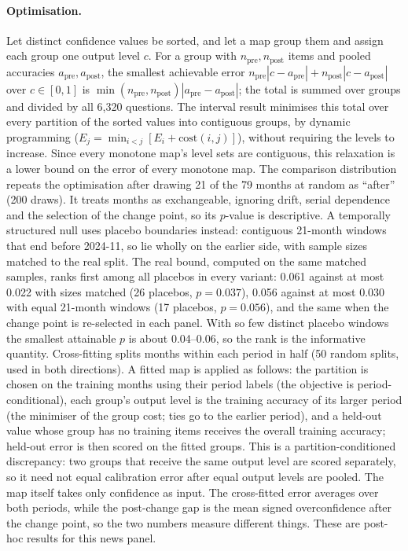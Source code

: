 \documentclass[10pt,twocolumn]{article}
\begin{document}
\paragraph{Optimisation.} Let distinct confidence values be sorted, and let a
map group them and assign each group one output level $c$. For a group with
$n_{\text{pre}}, n_{\text{post}}$ items and pooled accuracies $a_{\text{pre}},
a_{\text{post}}$, the smallest achievable error $n_{\text{pre}}|c-a_{\text{pre}}|
+ n_{\text{post}}|c-a_{\text{post}}|$ over $c\in[0,1]$ is $\min(n_{\text{pre}},
n_{\text{post}})|a_{\text{pre}}-a_{\text{post}}|$; the total is summed over groups and
divided by all 6{,}320 questions. The interval result minimises this total over
every partition of the sorted values into contiguous groups, by dynamic
programming ($E_j=\min_{i<j}[E_i+\text{cost}(i,j)]$), without requiring the
levels to increase. Since every monotone map's level sets are contiguous, this
relaxation is a lower bound on the error of every monotone map. The
comparison distribution repeats the optimisation after drawing 21 of the 79
months at random as ``after'' (200 draws). It treats months as exchangeable,
ignoring drift, serial dependence and the selection of the change point, so
its $p$-value is descriptive. A temporally structured null uses placebo
boundaries instead: contiguous 21-month windows that end before 2024-11, so
lie wholly on the earlier side, with sample sizes matched to the real split.
The real bound, computed on the same matched samples, ranks first among all
placebos in every variant: 0.061 against
at most 0.022 with sizes matched (26 placebos, $p=0.037$), 0.056 against at
most 0.030 with equal 21-month windows (17 placebos, $p=0.056$), and the
same when the change point is re-selected in each panel. With so few
distinct placebo windows the smallest attainable $p$ is about 0.04--0.06, so
the rank is the informative quantity. Cross-fitting splits months within each period in
half (50 random splits, used in both directions). A fitted map is applied as
follows: the partition is chosen on the training months using their period
labels (the objective is period-conditional), each group's output level is
the training accuracy of its larger period (the minimiser of the group cost;
ties go to the earlier period), and a held-out value whose group has no
training items receives the overall training accuracy; held-out error is
then scored on the fitted groups. This is a partition-conditioned
discrepancy: two groups that receive the same output level are scored
separately, so it need not equal calibration error after equal output levels
are pooled. The map itself takes only confidence as input. The cross-fitted error
averages over both periods, while the post-change gap is the mean signed
overconfidence after the change point, so the two numbers measure different
things.
These are post-hoc results for this news panel.
\end{document}
